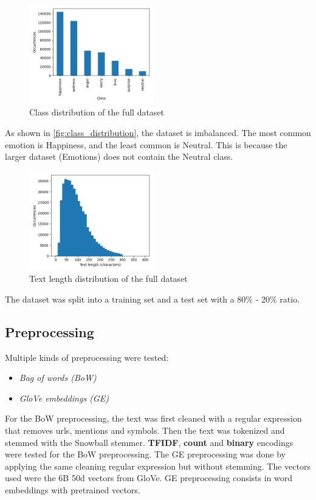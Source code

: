 \begin{figure}[H]
    \capstart
    \centering
    \includegraphics[width=0.48\textwidth]{images/class_distribution.png}
    \caption{Class distribution of the full dataset}
    \label{fig:class_distribution}
\end{figure}

As shown in \autoref{fig:class_distribution},
the dataset is imbalanced. The most common
emotion is Happiness, and the least common
is Neutral. This is because the larger dataset
(Emotions) does not contain the Neutral class.

\begin{figure}[H]
    \capstart
    \centering
    \includegraphics[width=0.48\textwidth]{images/length_distribution.png}
    \caption{Text length distribution of the full dataset}
    \label{fig:length_distribution}
\end{figure}

The dataset was split into a training set
and a test set with a 80\% - 20\% ratio.

\subsection{Preprocessing}
Multiple kinds of preprocessing were tested:
\begin{itemize}
    \item \textit{Bag of words (BoW)}
    \item \textit{GloVe embeddings (GE)}
\end{itemize}
For the BoW preprocessing, the text was
first cleaned with a regular expression that
removes urls, mentions and symbols. Then the
text was tokenized and stemmed with the 
Snowball stemmer. \textbf{TFIDF}, 
\textbf{count} and \textbf{binary}
encodings were tested for the BoW 
preprocessing.
The GE preprocessing was done by applying 
the same cleaning regular
expression but without stemming. The vectors
used were the 6B 50d vectors from
GloVe\cite{glove}.
GE preprocessing consists in word embeddings
with pretrained vectors.
